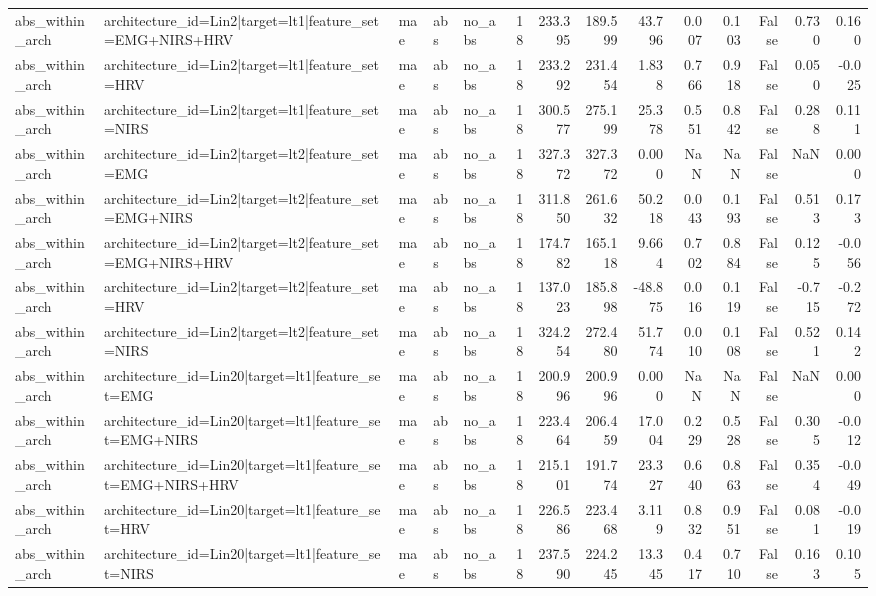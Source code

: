 \begin{table}
\begin{tabular}{lllllrrrrrrrrr}
abs_within_arch & architecture_id=Lin2|target=lt1|feature_set=EMG+NIRS+HRV & mae & abs & no_abs & 18 & 233.395 & 189.599 & 43.796 & 0.007 & 0.103 & False & 0.730 & 0.160 \\
abs_within_arch & architecture_id=Lin2|target=lt1|feature_set=HRV & mae & abs & no_abs & 18 & 233.292 & 231.454 & 1.838 & 0.766 & 0.918 & False & 0.050 & -0.025 \\
abs_within_arch & architecture_id=Lin2|target=lt1|feature_set=NIRS & mae & abs & no_abs & 18 & 300.577 & 275.199 & 25.378 & 0.551 & 0.842 & False & 0.288 & 0.111 \\
abs_within_arch & architecture_id=Lin2|target=lt2|feature_set=EMG & mae & abs & no_abs & 18 & 327.372 & 327.372 & 0.000 & NaN & NaN & False & NaN & 0.000 \\
abs_within_arch & architecture_id=Lin2|target=lt2|feature_set=EMG+NIRS & mae & abs & no_abs & 18 & 311.850 & 261.632 & 50.218 & 0.043 & 0.193 & False & 0.513 & 0.173 \\
abs_within_arch & architecture_id=Lin2|target=lt2|feature_set=EMG+NIRS+HRV & mae & abs & no_abs & 18 & 174.782 & 165.118 & 9.664 & 0.702 & 0.884 & False & 0.125 & -0.056 \\
abs_within_arch & architecture_id=Lin2|target=lt2|feature_set=HRV & mae & abs & no_abs & 18 & 137.023 & 185.898 & -48.875 & 0.016 & 0.119 & False & -0.715 & -0.272 \\
abs_within_arch & architecture_id=Lin2|target=lt2|feature_set=NIRS & mae & abs & no_abs & 18 & 324.254 & 272.480 & 51.774 & 0.010 & 0.108 & False & 0.521 & 0.142 \\
abs_within_arch & architecture_id=Lin20|target=lt1|feature_set=EMG & mae & abs & no_abs & 18 & 200.996 & 200.996 & 0.000 & NaN & NaN & False & NaN & 0.000 \\
abs_within_arch & architecture_id=Lin20|target=lt1|feature_set=EMG+NIRS & mae & abs & no_abs & 18 & 223.464 & 206.459 & 17.004 & 0.229 & 0.528 & False & 0.305 & -0.012 \\
abs_within_arch & architecture_id=Lin20|target=lt1|feature_set=EMG+NIRS+HRV & mae & abs & no_abs & 18 & 215.101 & 191.774 & 23.327 & 0.640 & 0.863 & False & 0.354 & -0.049 \\
abs_within_arch & architecture_id=Lin20|target=lt1|feature_set=HRV & mae & abs & no_abs & 18 & 226.586 & 223.468 & 3.119 & 0.832 & 0.951 & False & 0.081 & -0.019 \\
abs_within_arch & architecture_id=Lin20|target=lt1|feature_set=NIRS & mae & abs & no_abs & 18 & 237.590 & 224.245 & 13.345 & 0.417 & 0.710 & False & 0.163 & 0.105 \\

\end{tabular}
\end{table}
